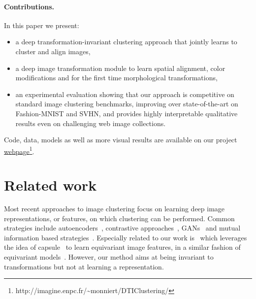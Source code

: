\documentclass{article}
\begin{document}
\vspace{-0.7em}
\paragraph{Contributions.} In this paper we present:
\bgroup\setlength\parskip{0pt}
\begin{itemize}[itemsep=0pt,topsep=0pt,partopsep=0pt,parsep=0pt,leftmargin=5mm]
  \item  a deep transformation-invariant clustering approach that jointly learns to cluster 
    and align images,
  \item a deep image transformation module to learn spatial alignment,  color modifications 
    and for the first time morphological transformations,
  \item an experimental evaluation showing that our approach is competitive on standard image 
    clustering benchmarks, improving over state-of-the-art on Fashion-MNIST and SVHN, and 
    provides highly interpretable qualitative results even on challenging web image 
    collections.
\end{itemize}
\egroup
Code, data, models as well as more visual results are available on our
project \href{http://imagine.enpc.fr/~monniert/DTIClustering/}
{webpage}\footnote{http://imagine.enpc.fr/\textasciitilde monniert/DTIClustering/}.


\section{Related work}
\label{sec:related}

Most recent approaches to image clustering focus on learning deep image representations, or 
features, on which clustering can be performed. Common strategies include 
autoencoders~\cite{xieUnsupervisedDeepEmbedding2016, dizajiDeepClusteringJoint2017, 
jiangVariationalDeepEmbedding2017, kosiorekStackedCapsuleAutoencoders2019}, contrastive 
approaches~\cite{yangJointUnsupervisedLearning2016, changDeepAdaptiveImage2017,
shahamSpectralNetSpectralClustering2018}, 
GANs~\cite{chenInfoGANInterpretableRepresentation2016, zhouDeepAdversarialSubspace2018, 
mukherjeeClusterGANLatentSpace2019} and mutual information based 
strategies~\cite{huLearningDiscreteRepresentations2017, hausserAssociativeDeepClustering2018, 
jiInvariantInformationClustering2019}. Especially related to our work 
is~\cite{kosiorekStackedCapsuleAutoencoders2019} which leverages the idea of 
capsule~\cite{hintonTransformingAutoEncoders2011} to learn equivariant image features, in a 
similar fashion of equivariant models~\cite{lencUnderstandingImageRepresentations2015, 
taiEquivariantTransformerNetworks2019}. However, our method aims at being invariant to 
transformations but not at learning a representation.
 
\end{document}
